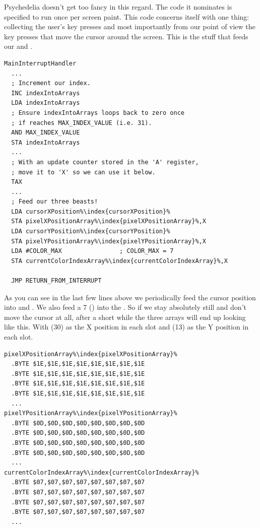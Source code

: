 Psychedelia doesn't get too fancy in this regard. The code it nominates is specified to run once per screen paint. This code concerns itself
with one thing: collecting the user's key presses and most importantly from our point of view the key presses that move the cursor around
the screen. This is the stuff that feeds our  and .

\begin{lstlisting}[escapechar=\%]
MainInterruptHandler   
  ...
  ; Increment our index.
  INC indexIntoArrays
  LDA indexIntoArrays
  ; Ensure indexIntoArrays loops back to zero once
  ; if reaches MAX_INDEX_VALUE (i.e. 31).
  AND MAX_INDEX_VALUE
  STA indexIntoArrays
  ...
  ; With an update counter stored in the 'A' register,
  ; move it to 'X' so we can use it below.
  TAX
  ...
  ; Feed our three beasts!
  LDA cursorXPosition%\index{cursorXPosition}%
  STA pixelXPositionArray%\index{pixelXPositionArray}%,X
  LDA cursorYPosition%\index{cursorYPosition}%
  STA pixelYPositionArray%\index{pixelYPositionArray}%,X
  LDA #COLOR_MAX                ; COLOR_MAX = 7
  STA currentColorIndexArray%\index{currentColorIndexArray}%,X

  JMP RETURN_FROM_INTERRUPT
\end{lstlisting}

As you can see in the last few lines above we periodically feed the cursor position into  and .
We also feed a 7 () into the . So if we stay absolutely still and don't move the cursor at all, after
a short while the three arrays will end up looking like this. With  (30) as the X position in each slot and  (13) as the Y
position in each slot.
\clearpage

\begin{lstlisting}[escapechar=\%]
pixelXPositionArray%\index{pixelXPositionArray}%   
  .BYTE $1E,$1E,$1E,$1E,$1E,$1E,$1E,$1E
  .BYTE $1E,$1E,$1E,$1E,$1E,$1E,$1E,$1E
  .BYTE $1E,$1E,$1E,$1E,$1E,$1E,$1E,$1E
  .BYTE $1E,$1E,$1E,$1E,$1E,$1E,$1E,$1E
  ...
pixelYPositionArray%\index{pixelYPositionArray}%   
  .BYTE $0D,$0D,$0D,$0D,$0D,$0D,$0D,$0D
  .BYTE $0D,$0D,$0D,$0D,$0D,$0D,$0D,$0D
  .BYTE $0D,$0D,$0D,$0D,$0D,$0D,$0D,$0D
  .BYTE $0D,$0D,$0D,$0D,$0D,$0D,$0D,$0D
  ...
currentColorIndexArray%\index{currentColorIndexArray}%   
  .BYTE $07,$07,$07,$07,$07,$07,$07,$07
  .BYTE $07,$07,$07,$07,$07,$07,$07,$07
  .BYTE $07,$07,$07,$07,$07,$07,$07,$07
  .BYTE $07,$07,$07,$07,$07,$07,$07,$07
  ...
\end{lstlisting}

